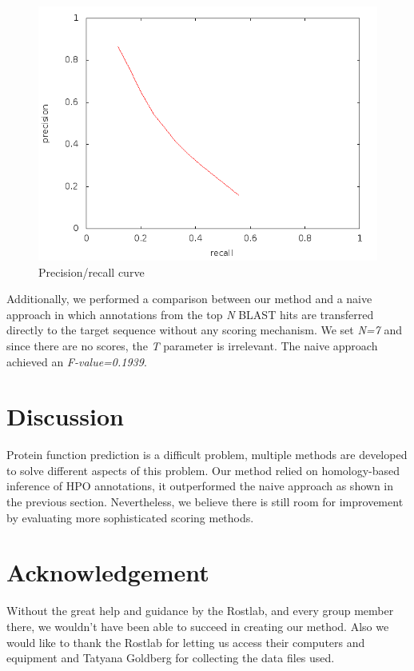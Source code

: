 \documentclass{bioinfo}
\begin{document}
\begin{figure}[!tpb]
\centerline{\includegraphics[scale=0.4]{bilder/image-4.png}}
\caption{Precision/recall curve}
\label{precrec}
\end{figure}

Additionally, we performed a comparison between our method and a naive approach in which annotations from the top \textit{N} BLAST hits are transferred directly to the target sequence without any scoring mechanism. We set \textit{N=7} and since there are no scores, the \textit{T} parameter is irrelevant. The naive approach achieved an \textit{F-value=0.1939}.

\section{Discussion}

Protein function prediction is a difficult problem, multiple methods are developed to solve different aspects of this problem. Our method relied on homology-based inference of HPO annotations, it outperformed the naive approach as shown in the previous section. Nevertheless, we believe there is still room for improvement by evaluating more sophisticated scoring methods.

\section*{Acknowledgement}
Without the great help and guidance by the Rostlab, and every group member there, we wouldn't have been able to succeed in creating our method. Also we would like to thank the Rostlab for letting us access their computers and equipment and Tatyana Goldberg for collecting the data files used.
\end{document}
